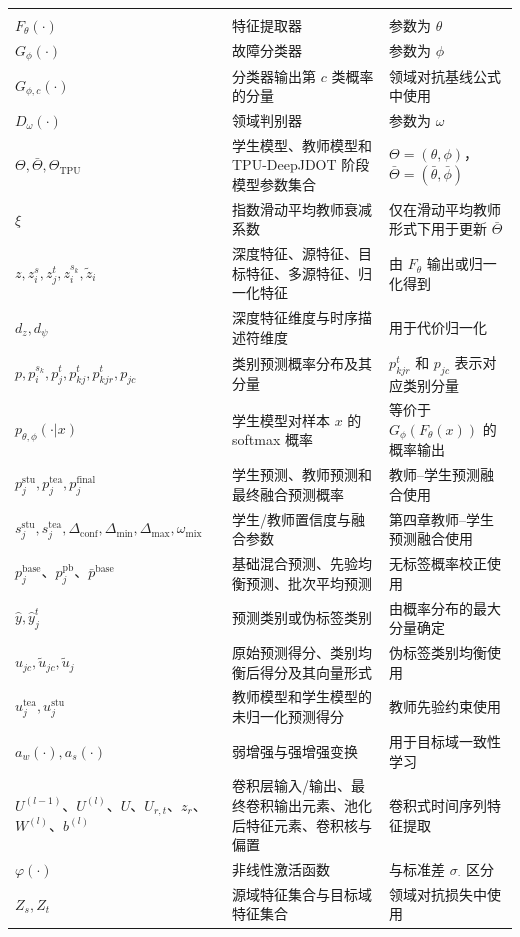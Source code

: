 \documentclass{seuthesis-2022}
\begin{document}
{\begin{longtable}{@{}>{\raggedright\arraybackslash}p{}>{\raggedright\arraybackslash}p{}>{\raggedright\arraybackslash}p{}@{}}
    \addlinespace
    \multicolumn{3}{l}{\textbf{模型、特征与预测}}\\
    \addlinespace
    $F_\theta(\cdot)$ & 特征提取器 & 参数为 $\theta$ \\
    $G_\phi(\cdot)$ & 故障分类器 & 参数为 $\phi$ \\
    $G_{\phi,c}(\cdot)$ & 分类器输出第 $c$ 类概率的分量 & 领域对抗基线公式中使用 \\
    $D_\omega(\cdot)$ & 领域判别器 & 参数为 $\omega$ \\
    $\Theta,\bar{\Theta},\Theta_{\mathrm{TPU}}$ & 学生模型、教师模型和 TPU-DeepJDOT 阶段模型参数集合 & $\Theta=(\theta,\phi)$，$\bar{\Theta}=(\bar{\theta},\bar{\phi})$ \\
    $\xi$ & 指数滑动平均教师衰减系数 & 仅在滑动平均教师形式下用于更新 $\bar{\Theta}$ \\
    $z,z_i^s,z_j^t,z_i^{s_k},\tilde{z}_i$ & 深度特征、源特征、目标特征、多源特征、归一化特征 & 由 $F_\theta$ 输出或归一化得到 \\
    $d_z,d_\psi$ & 深度特征维度与时序描述符维度 & 用于代价归一化 \\
    $p,p_i^{s_k},p_j^t,p_{kj}^t,p_{kjr}^t,p_{jc}$ & 类别预测概率分布及其分量 & $p_{kjr}^t$ 和 $p_{jc}$ 表示对应类别分量 \\
    $p_{\theta,\phi}(\cdot|x)$ & 学生模型对样本 $x$ 的 softmax 概率 & 等价于 $G_\phi(F_\theta(x))$ 的概率输出 \\
    $p_j^{\mathrm{stu}},p_j^{\mathrm{tea}},p_j^{\mathrm{final}}$ & 学生预测、教师预测和最终融合预测概率 & 教师--学生预测融合使用 \\
    $s_j^{\mathrm{stu}},s_j^{\mathrm{tea}},\Delta_{\mathrm{conf}},\Delta_{\min},\Delta_{\max},\omega_{\mathrm{mix}}$ & 学生/教师置信度与融合参数 & 第四章教师--学生预测融合使用 \\
    $p_j^{\mathrm{base}}$、$p_j^{\mathrm{pb}}$、$\bar{p}^{\mathrm{base}}$ & 基础混合预测、先验均衡预测、批次平均预测 & 无标签概率校正使用 \\
    $\hat{y},\hat{y}_j^t$ & 预测类别或伪标签类别 & 由概率分布的最大分量确定 \\
    $u_{jc},\tilde{u}_{jc},\tilde{u}_j$ & 原始预测得分、类别均衡后得分及其向量形式 & 伪标签类别均衡使用 \\
    $u_j^{\mathrm{tea}},u_j^{\mathrm{stu}}$ & 教师模型和学生模型的未归一化预测得分 & 教师先验约束使用 \\
    $a_w(\cdot),a_s(\cdot)$ & 弱增强与强增强变换 & 用于目标域一致性学习 \\
    $U^{(l-1)}$、$U^{(l)}$、$U$、$U_{r,t}$、$z_r$、$W^{(l)}$、$b^{(l)}$ & 卷积层输入/输出、最终卷积输出元素、池化后特征元素、卷积核与偏置 & 卷积式时间序列特征提取 \\
    $\varphi(\cdot)$ & 非线性激活函数 & 与标准差 $\sigma_{\cdot}$ 区分 \\
    $Z_s,Z_t$ & 源域特征集合与目标域特征集合 & 领域对抗损失中使用 \\


\end{longtable}}
\end{document}
